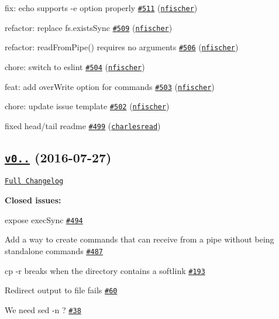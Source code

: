 \begin{DoxyItemize}
\item fix\+: echo supports -\/e option properly \href{https://github.com/shelljs/shelljs/pull/511}{\tt \#511} (\href{https://github.com/nfischer}{\tt nfischer})
\item refactor\+: replace fs.\+exists\+Sync \href{https://github.com/shelljs/shelljs/pull/509}{\tt \#509} (\href{https://github.com/nfischer}{\tt nfischer})
\item refactor\+: read\+From\+Pipe() requires no arguments \href{https://github.com/shelljs/shelljs/pull/506}{\tt \#506} (\href{https://github.com/nfischer}{\tt nfischer})
\item chore\+: switch to eslint \href{https://github.com/shelljs/shelljs/pull/504}{\tt \#504} (\href{https://github.com/nfischer}{\tt nfischer})
\item feat\+: add over\+Write option for commands \href{https://github.com/shelljs/shelljs/pull/503}{\tt \#503} (\href{https://github.com/nfischer}{\tt nfischer})
\item chore\+: update issue template \href{https://github.com/shelljs/shelljs/pull/502}{\tt \#502} (\href{https://github.com/nfischer}{\tt nfischer})
\item fixed head/tail readme \href{https://github.com/shelljs/shelljs/pull/499}{\tt \#499} (\href{https://github.com/charlesread}{\tt charlesread})
\end{DoxyItemize}

\subsection*{\href{https://github.com/shelljs/shelljs/tree/v0.7.3}{\tt v0..} (2016-\/07-\/27)}

\href{https://github.com/shelljs/shelljs/compare/v0.7.2...v0.7.3}{\tt Full Changelog}

{\bfseries Closed issues\+:}


\begin{DoxyItemize}
\item expose exec\+Sync \href{https://github.com/shelljs/shelljs/issues/494}{\tt \#494}
\item Add a way to create commands that can receive from a pipe without being standalone commands \href{https://github.com/shelljs/shelljs/issues/487}{\tt \#487}
\item cp -\/r breaks when the directory contains a softlink \href{https://github.com/shelljs/shelljs/issues/193}{\tt \#193}
\item Redirect output to file fails \href{https://github.com/shelljs/shelljs/issues/60}{\tt \#60}
\item We need sed -\/n ? \href{https://github.com/shelljs/shelljs/issues/38}{\tt \#38}
\end{DoxyItemize}

